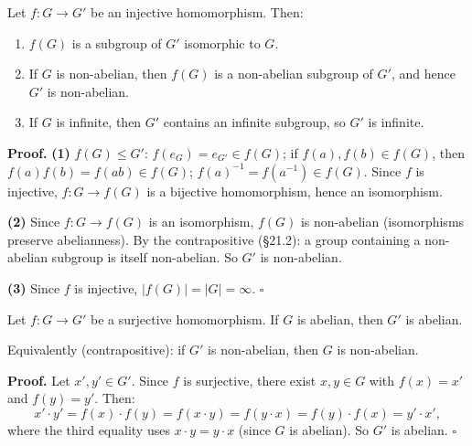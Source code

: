 \documentclass[11pt]{report}
\renewenvironment{proof}[1][Proof]{\noindent\textbf{#1.} }{\hfill$\square$\par\vspace{5pt}}
\begin{document}
\begin{propbox}
Let $f: G \to G'$ be an injective homomorphism. Then:
\begin{enumerate}
    \item $f(G)$ is a subgroup of $G'$ isomorphic to $G$.
    \item If $G$ is non-abelian, then $f(G)$ is a non-abelian subgroup of $G'$, and hence $G'$ is non-abelian.
    \item If $G$ is infinite, then $G'$ contains an infinite subgroup, so $G'$ is infinite.
\end{enumerate}
\end{propbox}

\begin{proof}
\textbf{(1)} $f(G) \leq G'$: $f(e_G) = e_{G'} \in f(G)$; if $f(a), f(b) \in f(G)$, then $f(a)f(b) = f(ab) \in f(G)$; $f(a)^{-1} = f(a^{-1}) \in f(G)$. Since $f$ is injective, $f: G \to f(G)$ is a bijective homomorphism, hence an isomorphism.

\textbf{(2)} Since $f: G \to f(G)$ is an isomorphism, $f(G)$ is non-abelian (isomorphisms preserve abelianness). By the contrapositive (\S 21.2): a group containing a non-abelian subgroup is itself non-abelian. So $G'$ is non-abelian.

\textbf{(3)} Since $f$ is injective, $|f(G)| = |G| = \infty$.
\end{proof}

\begin{propbox}
Let $f: G \to G'$ be a surjective homomorphism. If $G$ is abelian, then $G'$ is abelian.

Equivalently (contrapositive): if $G'$ is non-abelian, then $G$ is non-abelian.
\end{propbox}

\begin{proof}
Let $x', y' \in G'$. Since $f$ is surjective, there exist $x, y \in G$ with $f(x) = x'$ and $f(y) = y'$. Then:
\[x' \cdot y' = f(x) \cdot f(y) = f(x \cdot y) = f(y \cdot x) = f(y) \cdot f(x) = y' \cdot x',\]
where the third equality uses $x \cdot y = y \cdot x$ (since $G$ is abelian). So $G'$ is abelian.
\end{proof}
\end{document}
